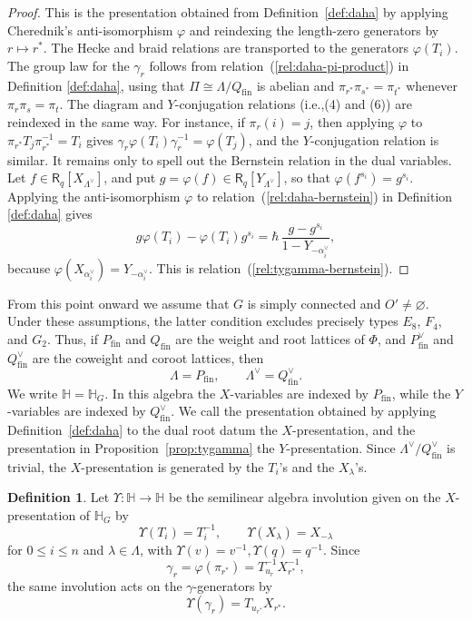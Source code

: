 \documentclass{amsart}
\newcommand{\Ring}{\mathsf{R}}
\theoremstyle{definition}
\newtheorem{defi}[Thm]{Definition}
\numberwithin{equation}{section}
\begin{document}
\begin{proof}
    This is the presentation obtained from Definition~\ref{def:daha} by applying
    Cherednik's anti-isomorphism $\varphi$ and reindexing the length-zero
    generators by \(r\mapsto r^*\). The Hecke and braid relations are transported
    to the generators \(\varphi(T_i)\). The group law for the $\gamma_r$ follows from
    relation~(\ref{rel:daha-pi-product}) in Definition \ref{def:daha}, using that \(\Pi\cong \Lambda/Q_{\mathrm{fin}}\) is abelian
    and \(\pi_{r^*}\pi_{s^*}=\pi_{t^*}\) whenever \(\pi_r\pi_s=\pi_t\).
    The diagram and \(Y\)-conjugation relations (i.e.,(4) and (6)) are reindexed in the same way.
    For instance, if \(\pi_r(i)=j\), then applying \(\varphi\) to
    \(\pi_{r^*}T_j\pi_{r^*}^{-1}=T_i\) gives
    \(\gamma_r \varphi(T_i)\gamma_r^{-1}=\varphi(T_j)\), and the \(Y\)-conjugation relation is
    similar. It remains only to spell out the Bernstein relation in the dual
    variables. Let \(f\in\Ring_q[X_{\Lambda^\vee}]\), and put
    \(g=\varphi(f)\in\Ring_q[Y_{\Lambda^\vee}]\), so that
    \(\varphi(f^{s_i})=g^{s_i}\). Applying the anti-isomorphism \(\varphi\) to
    relation~(\ref{rel:daha-bernstein}) in Definition \ref{def:daha} gives
    \[
    g\varphi(T_i)-\varphi(T_i)g^{s_i}
    =
    \hbar\,\frac{g-g^{s_i}}{1-Y_{-\alpha_i^\vee}},
    \]
    because \(\varphi(X_{\alpha_i^\vee})=Y_{-\alpha_i^\vee}\). This is
    relation~(\ref{rel:tygamma-bernstein}).
\end{proof}

From this point onward we assume that \(G\) is simply connected and
\(O'\neq\varnothing\). Under these assumptions, the latter condition
excludes precisely types \(E_8\), \(F_4\), and \(G_2\). Thus, if
\(P_{\mathrm{fin}}\) and \(Q_{\mathrm{fin}}\) are the weight and root lattices
of \(\Phi\), and \(P_{\mathrm{fin}}^\vee\) and \(Q_{\mathrm{fin}}^\vee\) are the
coweight and coroot lattices, then
\[
\Lambda=P_{\mathrm{fin}},
\qquad
\Lambda^\vee=Q_{\mathrm{fin}}^\vee.
\]
We write \(\mathbb H=\mathbb H_G\). In this algebra the \(X\)-variables are
indexed by \(P_{\mathrm{fin}}\), while the \(Y\)-variables are indexed by
\(Q_{\mathrm{fin}}^\vee\). We call the presentation obtained by applying
Definition~\ref{def:daha} to the dual root datum the \(X\)-presentation, and
the presentation in Proposition~\ref{prop:tygamma} the \(Y\)-presentation.
Since \(\Lambda^\vee/Q_{\mathrm{fin}}^\vee\) is trivial, the \(X\)-presentation
is generated by the \(T_i\)'s and the \(X_\lambda\)'s.

\begin{defi}\label{def:upsilon}
    Let $\Upsilon:\mathbb H\to\mathbb H$ be the semilinear algebra involution
    given on the \(X\)-presentation of \(\mathbb H_G\) by
    \[
    \Upsilon(T_i)=T_i^{-1},
    \qquad
    \Upsilon(X_\lambda)=X_{-\lambda}
    \]
    for $0\leqslant i\leqslant n$ and \(\lambda\in\Lambda\), with $\Upsilon(v) = v^{-1}, \Upsilon(q) = q^{-1}$.
    Since
    \[
    \gamma_r=\varphi(\pi_{r^*})=T_{u_r}^{-1}X_{r^*}^{-1},
    \]
    the same involution acts on the $\gamma$-generators by
    \[
    \Upsilon(\gamma_r)
    =
    T_{u_{r^*}}X_{r^*}.
    \]
\end{defi}
\end{document}
